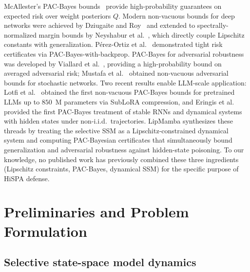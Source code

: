 \documentclass[journal,a4paper,10pt]{IEEEtran}
\theoremstyle{definition}
\theoremstyle{remark}
\newcommand{\modelname}{LipMamba}
\begin{document}
McAllester's PAC-Bayes bounds~\cite{mcallester2003pac} provide high-probability guarantees on expected risk over weight posteriors $Q$. Modern non-vacuous bounds for deep networks were achieved by Dziugaite and Roy~\cite{dziugaite2017computing} and extended to spectrally-normalized margin bounds by Neyshabur et al.~\cite{neyshabur2018pac}, which directly couple Lipschitz constants with generalization. Pérez-Ortiz et al.~\cite{perezortiz2021tighter} demonstrated tight risk certificates via PAC-Bayes-with-backprop. PAC-Bayes for adversarial robustness was developed by Viallard et al.~\cite{viallard2021pacbayes}, providing a high-probability bound on averaged adversarial risk; Mustafa et al.~\cite{mustafa2024nonvacuous} obtained non-vacuous adversarial bounds for stochastic networks. Two recent results enable LLM-scale application: Lotfi et al.~\cite{lotfi2024nonvacuous} obtained the first non-vacuous PAC-Bayes bounds for pretrained LLMs up to $850$~M parameters via SubLoRA compression, and Eringis et al.~\cite{eringis2024pacbayes} provided the first PAC-Bayes treatment of stable RNNs and dynamical systems with hidden states under non-i.i.d.\ trajectories. \modelname{} synthesizes these threads by treating the selective SSM as a Lipschitz-constrained dynamical system and computing PAC-Bayesian certificates that simultaneously bound generalization and adversarial robustness against hidden-state poisoning. To our knowledge, no published work has previously combined these three ingredients (Lipschitz constraints, PAC-Bayes, dynamical SSM) for the specific purpose of HiSPA defense.


\section{Preliminaries and Problem Formulation}
\label{sec:preliminaries}

\subsection{Selective state-space model dynamics}
\end{document}
